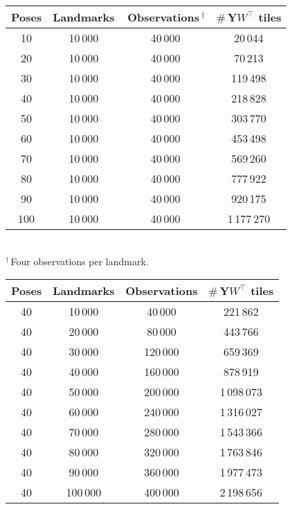 \begin{table*}[h]
  \begin{minipage}[t]{0.48\textwidth}
    \caption{Pose sweep: problem size versus cost drivers.}
    \label{tab:synth_pose}
    \centering\footnotesize
    \begin{tabular}{@{}cccc@{}}
      \toprule
      Poses & Landmarks & $\,$Observations\,$^{\dagger}$ &
      $\#$\,Y$\!W^{\!\top}$ tiles\\
      \midrule
      10 & 10\,000 & 40\,000 & 20\,044\\
      20 & 10\,000 & 40\,000 & 70\,213\\
      30 & 10\,000 & 40\,000 & 119\,498\\
      40 & 10\,000 & 40\,000 & 218\,828\\
      50 & 10\,000 & 40\,000 & 303\,770\\
      60 & 10\,000 & 40\,000 & 453\,498\\
      70 & 10\,000 & 40\,000 & 569\,260\\
      80 & 10\,000 & 40\,000 & 777\,922\\
      90 & 10\,000 & 40\,000 & 920\,175\\
      100 & 10\,000 & 40\,000 & 1\,177\,270\\
      \bottomrule
    \end{tabular}
    \vspace{2pt}\\
    \footnotesize$^{\dagger}$\,Four observations per landmark.
  \end{minipage}
  \hfill
  \begin{minipage}[t]{0.48\textwidth}
    \caption{Landmark sweep: problem size versus cost drivers.}
    \label{tab:synth_lmk}
    \centering\footnotesize
    \begin{tabular}{@{}cccc@{}}
      \toprule
      Poses & Landmarks & Observations & $\#$\,Y$\!W^{\!\top}$ tiles\\
      \midrule
       40 & 10\,000 &  40\,000 &   221\,862\\
       40 & 20\,000 &  80\,000 &   443\,766\\
       40 & 30\,000 & 120\,000 &   659\,369\\
       40 & 40\,000 & 160\,000 &   878\,919\\
       40 & 50\,000 & 200\,000 & 1\,098\,073\\
       40 & 60\,000 & 240\,000 & 1\,316\,027\\
       40 & 70\,000 & 280\,000 & 1\,543\,366\\
       40 & 80\,000 & 320\,000 & 1\,763\,846\\
       40 & 90\,000 & 360\,000 & 1\,977\,473\\
       40 & 100\,000 & 400\,000 & 2\,198\,656\\
      \bottomrule
    \end{tabular}
  \end{minipage}
\end{table*}

